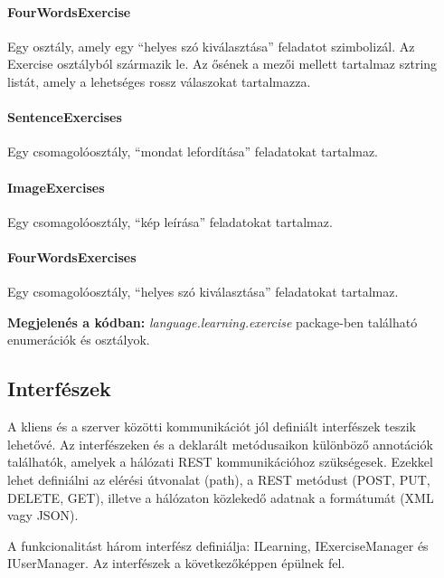 \documentclass[11pt, a4paper]{article}
\begin{document}
    \paragraph{FourWordsExercise} Egy osztály, amely egy ``helyes szó kiválasztása'' feladatot szimbolizál. Az Exercise osztályból származik le. Az ősének a mezői mellett tartalmaz sztring listát, amely a lehetséges rossz válaszokat tartalmazza.
    
    \paragraph{SentenceExercises} Egy csomagolóosztály, ``mondat lefordítása'' feladatokat tartalmaz.
    
    \paragraph{ImageExercises} Egy csomagolóosztály, ``kép leírása'' feladatokat tartalmaz.
    
    \paragraph{FourWordsExercises} Egy csomagolóosztály, ``helyes szó kiválasztása'' feladatokat tartalmaz.
    
    \vspace{3mm}
    \textbf{Megjelenés a kódban:} \textit{language.learning.exercise} package-ben található enumerációk és osztályok.
    
    \subsection{Interfészek}
    \label{sec:interfészek}
    
    A kliens és a szerver közötti kommunikációt jól definiált interfészek teszik lehetővé. Az interfészeken és a deklarált metódusaikon különböző annotációk találhatók, amelyek a hálózati REST kommunikációhoz szükségesek. Ezekkel lehet definiálni az elérési útvonalat (path), a REST metódust (POST, PUT, DELETE, GET), illetve a hálózaton közlekedő adatnak a formátumát (XML vagy JSON).
    
    A funkcionalitást három interfész definiálja: ILearning, IExerciseManager és IUserManager. Az interfészek a következőképpen épülnek fel.
    
\end{document}
